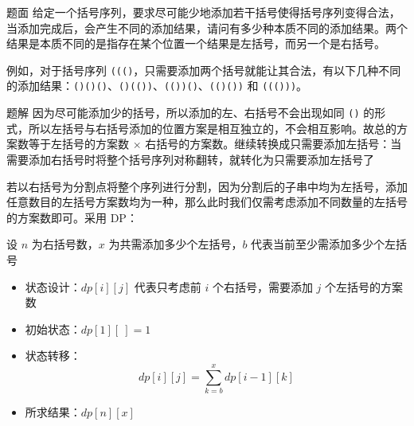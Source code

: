 \documentclass{pptt}
\begin{document}
\begin{frame}{题面}
    给定一个括号序列，要求尽可能少地添加若干括号使得括号序列变得合法，当添加完成后，会产生不同的添加结果，请问有多少种本质不同的添加结果。两个结果是本质不同的是指存在某个位置一个结果是左括号，而另一个是右括号。

    例如，对于括号序列 \texttt{((()}，只需要添加两个括号就能让其合法，有以下几种不同的添加结果：\texttt{()()()}、\texttt{()(())}、\texttt{(())()}、\texttt{(()())} 和 \texttt{((()))}。
\end{frame}

\begin{frame}{题解}
    因为尽可能添加少的括号，所以添加的左、右括号不会出现如同 \texttt{()} 的形式，所以左括号与右括号添加的位置方案是相互独立的，不会相互影响。故总的方案数等于左括号的方案数 $\times$ 右括号的方案数。继续转换成只需要添加左括号：当需要添加右括号时将整个括号序列对称翻转，就转化为只需要添加左括号了

    若以右括号为分割点将整个序列进行分割，因为分割后的子串中均为左括号，添加任意数目的左括号方案数均为一种，那么此时我们仅需考虑添加不同数量的左括号的方案数即可。采用 DP：

    设 $n$ 为右括号数，$x$ 为共需添加多少个左括号，$b$ 代表当前至少需添加多少个左括号

    \begin{itemize}
        \item 状态设计：$dp[i][j]$ 代表只考虑前 $i$ 个右括号，需要添加 $j$ 个左括号的方案数
        \item 初始状态：$dp[1][~]=1$
        \item 状态转移：$$dp[i][j]=\sum_{k=b}^{x}dp[i-1][k]$$
        \item 所求结果：$dp[n][x]$
    \end{itemize}
\end{frame}
\end{document}
